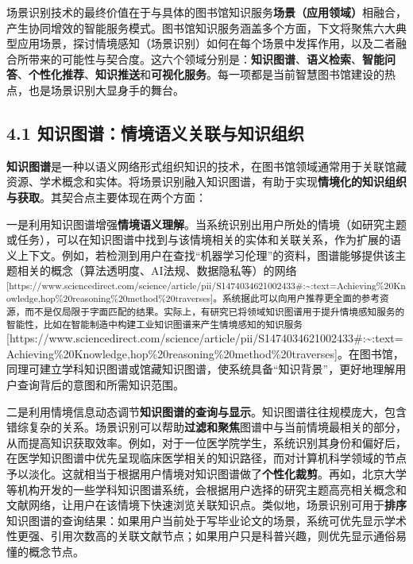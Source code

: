 \documentclass[
  letterpaper,
]{scrbook}
\begin{document}
场景识别技术的最终价值在于与具体的图书馆知识服务\textbf{场景（应用领域）}相融合，产生协同增效的智能服务模式。图书馆知识服务涵盖多个方面，下文将聚焦六大典型应用场景，探讨情境感知（场景识别）如何在每个场景中发挥作用，以及二者融合所带来的可能性与契合度。这六个领域分别是：\textbf{知识图谱}、\textbf{语义检索}、\textbf{智能问答}、\textbf{个性化推荐}、\textbf{知识推送}和\textbf{可视化服务}。每一项都是当前智慧图书馆建设的热点，也是场景识别大显身手的舞台。

\subsection{4.1
知识图谱：情境语义关联与知识组织}\label{ux77e5ux8bc6ux56feux8c31ux60c5ux5883ux8bedux4e49ux5173ux8054ux4e0eux77e5ux8bc6ux7ec4ux7ec7}

\textbf{知识图谱}是一种以语义网络形式组织知识的技术，在图书馆领域通常用于关联馆藏资源、学术概念和实体。将场景识别融入知识图谱，有助于实现\textbf{情境化的知识组织与获取}。其契合点主要体现在两个方面：

一是利用知识图谱增强\textbf{情境语义理解}。当系统识别出用户所处的情境（如研究主题或任务），可以在知识图谱中找到与该情境相关的实体和关联关系，作为扩展的语义上下文。例如，若检测到用户在查找``机器学习伦理''的资料，图谱能够提供该主题相关的概念（算法透明度、AI法规、数据隐私等）的网络\textsuperscript{{[}https://www.sciencedirect.com/science/article/pii/S1474034621002433\#:\textasciitilde:text=Achieving\%20Knowledge,hop\%20reasoning\%20method\%20traverses{]}。系统据此可以向用户推荐更全面的参考资源，而不是仅局限于字面匹配的结果。实际上，有研究已将领域知识图谱用于提升情境感知服务的智能性，比如在智能制造中构建工业知识图谱来产生情境感知的知识服务}{[}https://www.sciencedirect.com/science/article/pii/S1474034621002433\#:\textasciitilde:text=Achieving\%20Knowledge,hop\%20reasoning\%20method\%20traverses{]}。在图书馆，同理可建立学科知识图谱或馆藏知识图谱，使系统具备``知识背景''，更好地理解用户查询背后的意图和所需知识范围。

二是利用情境信息动态调节\textbf{知识图谱的查询与显示}。知识图谱往往规模庞大，包含错综复杂的关系。场景识别可以帮助\textbf{过滤和聚焦}图谱中与当前情境最相关的部分，从而提高知识获取效率。例如，对于一位医学院学生，系统识别其身份和偏好后，在医学知识图谱中优先呈现临床医学相关的知识路径，而对计算机科学领域的节点予以淡化。这就相当于根据用户情境对知识图谱做了\textbf{个性化裁剪}。再如，北京大学等机构开发的一些学科知识图谱系统，会根据用户选择的研究主题高亮相关概念和文献网络，让用户在该情境下快速浏览关联知识点。类似地，场景识别可用于\textbf{排序}知识图谱的查询结果：如果用户当前处于写毕业论文的场景，系统可优先显示学术性更强、引用次数高的关联文献节点；如果用户只是科普兴趣，则优先显示通俗易懂的概念节点。
\end{document}
